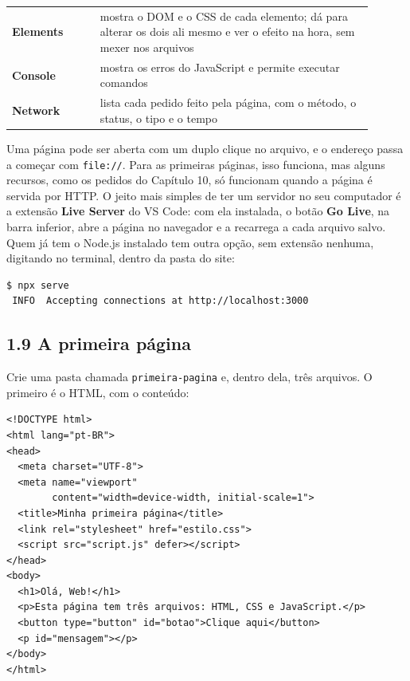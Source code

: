 \begin{center}
\begin{tabular}{@{}P{0.22\linewidth}P{0.68\linewidth}@{}}
\toprule
{}
 &  \\
\midrule
\textbf{Elements} & mostra o DOM e o CSS de cada elemento; dá para alterar os dois ali mesmo e ver o efeito na hora, sem mexer nos arquivos \\
 \textbf{Console} & mostra os erros do JavaScript e permite executar comandos \\
\textbf{Network} & lista cada pedido feito pela página, com o método, o status, o tipo e o tempo \\
\bottomrule
\end{tabular}
\end{center}

Uma página pode ser aberta com um duplo clique no arquivo, e o endereço passa a começar com \texttt{file://}. Para as primeiras páginas, isso funciona, mas alguns recursos, como os pedidos do Capítulo 10, só funcionam quando a página é servida por HTTP. O jeito mais simples de ter um servidor no seu computador é a extensão \textbf{Live Server} do VS Code: com ela instalada, o botão \textbf{Go Live}, na barra inferior, abre a página no navegador e a recarrega a cada arquivo salvo. Quem já tem o Node.js instalado tem outra opção, sem extensão nenhuma, digitando no terminal, dentro da pasta do site:

\begin{codigo}
\begin{Verbatim}[breaklines=true, breaksymbolleft={}, fontsize=\footnotesize]
$ npx serve
 INFO  Accepting connections at http://localhost:3000
\end{Verbatim}
\end{codigo}

\subsection{1.9 A primeira página}

Crie uma pasta chamada \texttt{primeira-pagina} e, dentro dela, três arquivos. O primeiro é o HTML, com o conteúdo:

\begin{codigo}
\begin{Verbatim}[breaklines=true, breaksymbolleft={}, fontsize=\footnotesize]
<!DOCTYPE html>
<html lang="pt-BR">
<head>
  <meta charset="UTF-8">
  <meta name="viewport"
        content="width=device-width, initial-scale=1">
  <title>Minha primeira página</title>
  <link rel="stylesheet" href="estilo.css">
  <script src="script.js" defer></script>
</head>
<body>
  <h1>Olá, Web!</h1>
  <p>Esta página tem três arquivos: HTML, CSS e JavaScript.</p>
  <button type="button" id="botao">Clique aqui</button>
  <p id="mensagem"></p>
</body>
</html>
\end{Verbatim}
\end{codigo}

